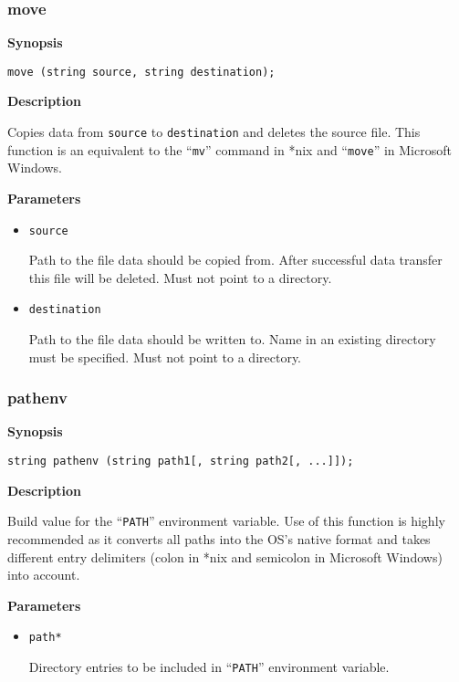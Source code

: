 \documentclass[a4paper, 10pt, titlepage]{article}
\begin{document}
\subsubsection{move}

\textbf{Synopsis}

\begin{verbatim}
move (string source, string destination);
\end{verbatim}

\textbf{Description}

Copies data from \texttt{source} to \texttt{destination} and deletes the source file. This function is an equivalent to the ``\texttt{mv}'' command in *nix and ``\texttt{move}'' in Microsoft Windows.

\textbf{Parameters}

\begin{itemize}
\item \texttt{source}

Path to the file data should be copied from. After successful data transfer this file will be deleted. Must not point to a directory.

\item \texttt{destination}

Path to the file data should be written to. Name in an existing directory must be specified. Must not point to a directory.
\end{itemize}

\subsubsection{pathenv}

\textbf{Synopsis}

\begin{verbatim}
string pathenv (string path1[, string path2[, ...]]);
\end{verbatim}

\textbf{Description}

Build value for the ``\texttt{PATH}'' environment variable. Use of this function is highly recommended as it converts all paths into the OS's native format and takes different entry delimiters (colon in *nix and semicolon in Microsoft Windows) into account.

\textbf{Parameters}

\begin{itemize}
\item \texttt{path*}

Directory entries to be included in ``\texttt{PATH}'' environment variable.
\end{itemize}
\end{document}
